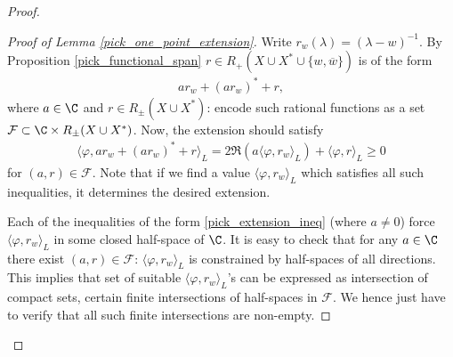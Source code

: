 \begin{proof}
	\begin{proof}[Proof of Lemma \ref{pick_one_point_extension}]
		Write $r_{w}(\lambda) = (\lambda - w)^{-1}$. By Proposition \ref{pick_functional_span} $r \in R_{+}(X \cup X^{*} \cup \{w, \overline{w}\})$ is of the form
		\begin{align*}
			ar_{w} + (ar_{w})^{*} + r,
		\end{align*}
		where $a \in \C$ and $r \in R_{\pm}(X \cup X^{*})$: encode such rational functions as a set $\mathcal{F} \subset \C \times R_{\pm}(X \cup X^{*})$. Now, the extension should satisfy
		\begin{align}\label{pick_extension_ineq}
			\langle \varphi, ar_{w} + (ar_{w})^{*} + r \rangle_{L} = 2 \Re(a \langle \varphi, r_{w} \rangle_{L}) + \langle \varphi, r\rangle_{L} \geq 0
		\end{align}
		for $(a, r) \in \mathcal{F}$. Note that if we find a value $\langle \varphi, r_{w} \rangle_{L}$ which satisfies all such inequalities, it determines the desired extension.

		Each of the inequalities of the form \ref{pick_extension_ineq} (where $a \neq 0$) force $\langle \varphi, r_{w} \rangle_{L}$ in some closed half-space of $\C$. It is easy to check that for any $a \in \C$ there exist $(a, r) \in \mathcal{F}$: $\langle \varphi, r_{w} \rangle_{L}$ is constrained by half-spaces of all directions. This implies that set of suitable $\langle \varphi, r_{w} \rangle_{L}$'s can be expressed as intersection of compact sets, certain finite intersections of half-spaces in $\mathcal{F}$. We hence just have to verify that all such finite intersections are non-empty.


\end{proof}
\end{proof}
